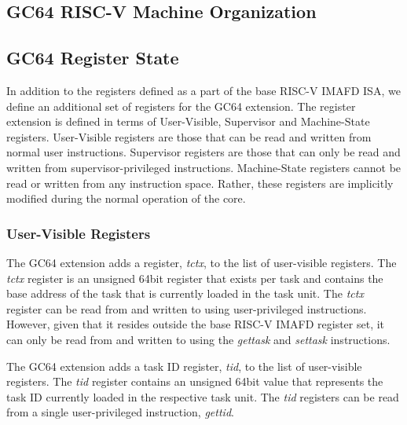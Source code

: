 \documentclass{article}
\begin{document}
\subsection{GC64 RISC-V Machine Organization}
\subsection{GC64 Register State}
In addition to the registers defined as a part of the base RISC-V IMAFD ISA, we define an additional set of registers for the GC64 extension.  The register extension is defined in terms of User-Visible, Supervisor and Machine-State registers.  User-Visible registers are those that can be read and written from normal user instructions.  Supervisor registers are those that can only be read and written from supervisor-privileged instructions.  Machine-State registers cannot be read or written from any instruction space.  Rather, these registers are implicitly modified during the normal operation of the core.     

\subsubsection{User-Visible Registers} 
The GC64 extension adds a register, \emph{tctx}, to the list of user-visible registers.  The \emph{tctx} register is an unsigned 64bit register that exists per task and contains the base address of the task that is currently loaded in the task unit. The \emph{tctx} register can be read from and written to using user-privileged instructions.  However, given that it resides outside the base RISC-V IMAFD register set, it can only be read from and written to using the \emph{gettask} and \emph{settask} instructions.  

\begin{center}
\end{center}

The GC64 extension adds a task ID register, \emph{tid}, to the list of user-visible registers.  The \emph{tid} register contains an unsigned 64bit value that represents the task ID currently loaded in the respective task unit.  The \emph{tid} registers can be read from a single user-privileged instruction, \emph{gettid}.  

\begin{center}
\end{center}
\end{document}
